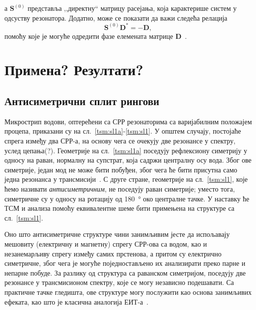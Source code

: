 \documentclass[main.tex]{subfiles}
\begin{document}
а $\mathbf{S}^{(0)}$ представља ,,директну`` матрицу расејања, која карактерише систем у одсуству резонатора. Додатно, може се показати да важи следећа релација
\begin{equation}
\mathbf{S}^{(0)}\mathbf{D^*}=-\mathbf{D},
\label{tsm:haus:d_usl}
\end{equation}
помоћу које је могуће одредити фазе елемената матрице $\mathbf{D}$~\cite{wonjoo}.


\section{Примена? Резултати?}
\subsection{Антисиметрични сплит рингови}%

Микрострип водови, оптерећени са СРР резонаторима са варијабилним положајем процепа, приказани су на сл.~\ref{tsm:sl1a}-\ref{tsm:sl1}. У општем случају, постојаће спрега између два СРР-а, на основу чега се очекују две резонансе у спектру, услед цепања(?). Геометрије на сл.~\ref{tsm:sl1a} поседују рефлексиону симетрију у односу на раван, нормалну на супстрат, која садржи централну осу вода. Због ове симетрије, један мод не може бити побуђен, због чега ће бити присутна само једна резонанса у трансмисији~\cite{radoman}. С друге стране, геометрије на сл.~\ref{tsm:sl1}, које ћемо називати \emph{антисиметричним}, не поседују раван симетрије; уместо тога, симетричне су у односу на ротацију од \SI{180}{\degree} око централне тачке. У наставку ће ТСМ и анализа помоћу еквивалентне шеме бити примењена на структуре са сл.~\ref{tsm:sl1}.

Оно што антисиметричне структуре чини занимљивим јесте да испољавају мешовиту (електричну и магнетну) спрегу СРР-ова са водом, као и незанемарљиву спрегу између самих прстенова, а притом су електрично симетричне, због чега је могуће поједностављено их анализирати преко парне и непарне побуде. За разлику од структура са раванском симетријом, поседују две резонансе у трансмисионом спектру, које се могу независно подешавати. Са практичне тачке гледишта, ове структуре могу послужити као основа занимљивих ефеката, као што је класична аналогија ЕИТ-а~\cite{tassin:09,mr03:eit,cihan}. %
\end{document}
